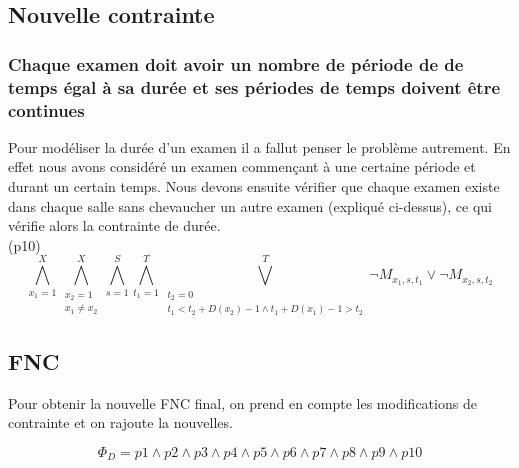 \documentclass[a4paper,11pt]{article}
\begin{document}
\subsection{Nouvelle contrainte}

\subsubsection{Chaque examen doit avoir un nombre de période de de temps égal à sa durée et ses périodes de temps doivent être continues}
Pour modéliser la durée d'un examen il a fallut penser le problème autrement. En effet nous avons considéré un examen commençant à une certaine période et durant un certain temps. Nous devons ensuite vérifier que chaque examen existe dans chaque salle sans chevaucher un autre examen (expliqué ci-dessus), ce qui vérifie alors la contrainte de durée.\\

(p10)
\begin{displaymath}
\bigwedge\limits_{x_{1}=1}^{X}\bigwedge\limits_{\substack{x_{2}=1 \\ x_{1} \neq x_{2}}}^{X}\bigwedge\limits_{s=1}^{S}\bigwedge\limits_{t_{1}=1}^{T}\bigvee\limits_{\substack{t_{2}=0 \\ t_{1} < t_{2} + D(x_{2})-1 \wedge t_{1} + D(x_{1})-1 > t_{2}}}^{T} \neg M_{x_{1}, s, t_{1}} \vee \neg M_{x_{2}, s, t_{2}}
\end{displaymath}

\subsection{FNC}
Pour obtenir la nouvelle FNC final, on prend en compte les modifications de contrainte et on rajoute la nouvelles.

\begin{displaymath}
	\Phi_{D} = p1 \wedge p2 \wedge p3 \wedge p4 \wedge p5 \wedge p6 \wedge p7 \wedge p8 \wedge p9 \wedge p10
\end{displaymath}
\end{document}

